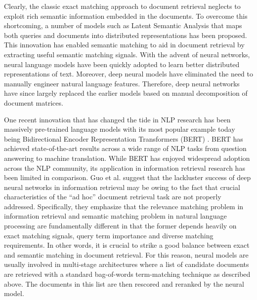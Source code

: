 Clearly, the classic exact matching approach to document retrieval neglects to exploit rich semantic information embedded in the documents.
To overcome this shortcoming, a number of models such as Latent Semantic Analysis \cite{deerwester1990indexing} that maps both queries and documents into distributed representations has been proposed.
This innovation has enabled semantic matching to aid in document retrieval by extracting useful semantic matching signals.
With the advent of neural networks, neural language models have been quickly adopted to learn better distributed representations of text.
Moreover, deep neural models have eliminated the need to manually engineer natural language features.
Therefore, deep neural networks have since largely replaced the earlier models based on manual decomposition of document matrices.


One recent innovation that has changed the tide in NLP research has been massively pre-trained language models with its most popular example today being Bidirectional Encoder Representation Transformers (BERT) \cite{devlin2018bert}.
BERT has achieved state-of-the-art results across a wide range of NLP tasks from question answering to machine translation.
While BERT has enjoyed widespread adoption across the NLP community, its application in information retrieval research has been limited in comparison.
Guo et al. \cite{guo2016deep} suggest that the lackluster success of deep neural networks in information retrieval may be owing to the fact that crucial characteristics of the ``ad hoc'' document retrieval task are not properly addressed.
Specifically, they emphasize that the relevance matching problem in information retrieval and semantic matching problem in natural language processing are fundamentally different in that the former depends heavily on exact matching signals, query term importance and diverse matching requirements.
In other words, it is crucial to strike a good balance between exact and semantic matching in document retrieval.
For this reason, neural models are usually involved in multi-stage architectures where a list of candidate documents are retrieved with a standard bag-of-words term-matching technique as described above.
The documents in this list are then rescored and reranked by the neural model.

